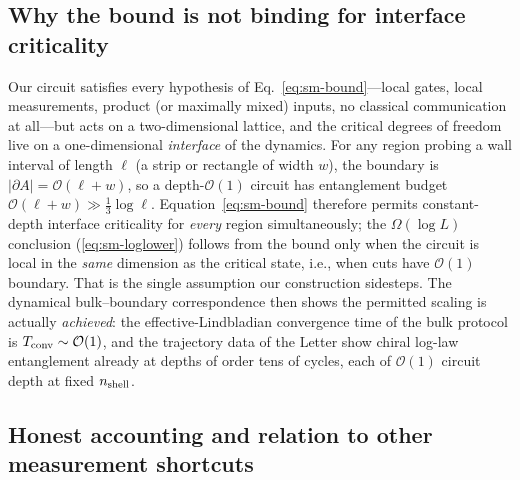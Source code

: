 \documentclass[aps,prl,onecolumn,superscriptaddress,nofootinbib]{revtex4-2}
\newcommand{\nsh}{n_{\rm shell}}
\begin{document}
\subsection{Why the bound is not binding for interface criticality}

Our circuit satisfies every hypothesis of Eq.~\eqref{eq:sm-bound}---local gates, local measurements, product (or maximally mixed) inputs, no classical communication at all---but acts on a two-dimensional lattice, and the critical degrees of freedom live on a one-dimensional \emph{interface} of the dynamics.  For any region probing a wall interval of length $\ell$ (a strip or rectangle of width $w$), the boundary is $|\partial A|=\mathcal{O}(\ell+w)$, so a depth-$\mathcal{O}(1)$ circuit has entanglement budget $\mathcal{O}(\ell+w)\gg\tfrac13\log\ell$.  Equation~\eqref{eq:sm-bound} therefore permits constant-depth interface criticality for \emph{every} region simultaneously; the $\Omega(\log L)$ conclusion (\ref{eq:sm-loglower}) follows from the bound only when the circuit is local in the \emph{same} dimension as the critical state, i.e., when cuts have $\mathcal{O}(1)$ boundary.  That is the single assumption our construction sidesteps.  The dynamical bulk--boundary correspondence \cite{BhuiyanPanJian2026} then shows the permitted scaling is actually \emph{achieved}: the effective-Lindbladian convergence time of the bulk protocol is $T_{\rm conv}\sim\mathcal{O}(1)$, and the trajectory data of the Letter show chiral log-law entanglement already at depths of order tens of cycles, each of $\mathcal{O}(1)$ circuit depth at fixed $\nsh$.

\subsection{Honest accounting and relation to other measurement shortcuts}
\end{document}
